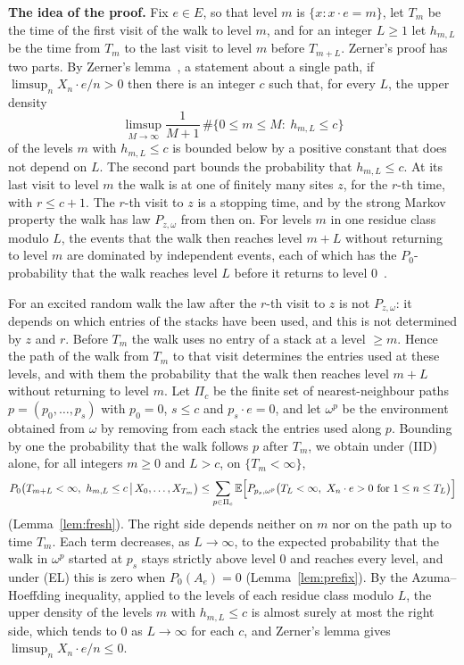 \documentclass[11pt]{amsart}
\theoremstyle{remark}
\newcommand{\E}{\mathbb{E}}
\begin{document}
\medskip\noindent\textbf{The idea of the proof.} Fix $e\in E$, so that level $m$ is $\{x:x\cdot e=m\}$, let $T_m$ be the
time of the first visit of the walk to level $m$, and for an integer $L\ge1$ let $h_{m,L}$ be the time from $T_m$ to the last visit
to level $m$ before $T_{m+L}$. Zerner's proof has two parts. By Zerner's lemma~\cite[Lemma 3]{Zer02}, a statement about a single path,
if $\limsup_nX_n\cdot e/n>0$ then there is an integer $c$ such that, for every $L$, the upper density
\[
\limsup_{M\to\infty}\frac1{M+1}\,\#\{0\le m\le M:\ h_{m,L}\le c\}
\]
of the levels $m$ with $h_{m,L}\le c$ is bounded below by a positive constant that does not depend on $L$. The second
part bounds the probability that $h_{m,L}\le c$. At its last visit to level $m$ the walk is at one of finitely many
sites $z$, for the $r$-th time, with $r\le c+1$. The $r$-th visit to $z$ is a stopping time, and by the strong Markov
property the walk has law $P_{z,\omega}$ from then on. For levels $m$ in one residue class modulo $L$, the events that the walk then reaches
level $m+L$ without returning to level $m$ are dominated by independent events, each of which has the $P_0$-probability that the walk
reaches level $L$ before it returns to level $0$~\cite[(15)]{Zer02}.

For an excited random walk the law after the $r$-th visit to $z$ is not $P_{z,\omega}$: it depends on which entries
of the stacks have been used, and this is not determined by $z$ and $r$. Before $T_m$ the walk uses no entry of a stack
at a level $\ge m$. Hence the path of the walk from $T_m$ to that visit determines the entries used at these levels,
and with them the probability that the walk then reaches level $m+L$ without returning to level $m$. Let $\Pi_c$ be the finite set of nearest-neighbour
paths $p=(p_0,\dots,p_s)$ with $p_0=0$, $s\le c$ and $p_s\cdot e=0$, and let $\omega^p$ be the environment obtained
from $\omega$ by removing from each stack the entries used along $p$. Bounding by one the probability that the walk
follows $p$ after $T_m$, we obtain under (IID) alone, for all integers $m\ge0$ and $L>c$, on $\{T_m<\infty\}$,
\[
P_0\bigl(T_{m+L}<\infty,\ h_{m,L}\le c\,\big|\,X_0,\dots,X_{T_m}\bigr)\le
\sum_{p\in\Pi_c}\E\Bigl[P_{p_s,\omega^p}\bigl(T_L<\infty,\ X_n\cdot e>0\text{ for }1\le n\le T_L\bigr)\Bigr]
\]
(Lemma~\ref{lem:fresh}). The right side depends neither on $m$ nor on the path up to time $T_m$. Each term decreases,
as $L\to\infty$, to the expected probability that the walk in $\omega^p$ started at $p_s$ stays strictly above level $0$ and
reaches every level, and under (EL) this is zero when $P_0(A_e)=0$ (Lemma~\ref{lem:prefix}). By the Azuma--Hoeffding
inequality, applied to the levels of each residue class modulo $L$, the upper density of the levels $m$ with
$h_{m,L}\le c$ is almost surely at most the right side, which tends to $0$ as $L\to\infty$ for
each $c$, and Zerner's lemma gives $\limsup_nX_n\cdot e/n\le0$.
\end{document}
